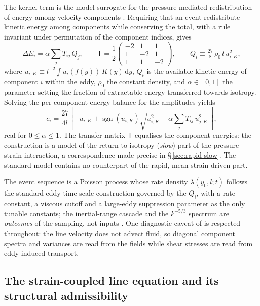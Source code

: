 \documentclass[lineno]{JFM-FLM_Au}
\begin{document}
The kernel term is the model surrogate for the pressure-mediated
redistribution of energy among velocity components
\citep{WunschKerstein2001,Kerstein2001}. Requiring that an event
redistribute kinetic energy among components while conserving the total,
with a rule invariant under permutation of the component indices, gives
\begin{equation}
  \Delta E_i = \alpha\sum_j T_{ij}\,Q_j,
  \qquad
  \mathsf{T}=\frac{1}{2}
  \begin{pmatrix}
    -2 & 1 & 1\\ 1 & -2 & 1\\ 1 & 1 & -2
  \end{pmatrix},
  \qquad
  Q_i\equiv\tfrac{27}{8}\,\rho_0\, l\, u_{i,K}^2,
  \label{eq:redistribution}
\end{equation}
where $u_{i,K}\equiv l^{-2}\!\int u_i(f(y))\,K(y)\,\mathrm{d}y$, $Q_i$ is
the available kinetic energy of component $i$ within the eddy, $\rho_0$
the constant density, and $\alpha\in[0,1]$ the parameter setting the
fraction of extractable energy transferred towards isotropy. Solving the
per-component energy balance for the amplitudes yields
\begin{equation}
  c_i = \frac{27}{4l}\left[-u_{i,K}
        +\operatorname{sgn}(u_{i,K})
        \sqrt{u_{i,K}^2+\alpha\sum_j T_{ij}\,u_{j,K}^2}\,\right],
  \label{eq:ci}
\end{equation}
real for $0\le\alpha\le1$. The transfer matrix $\mathsf{T}$ equalises the
component energies: the construction is a model of the
return-to-isotropy (\emph{slow}) part of the pressure--strain
interaction, a correspondence made precise in \S\,\ref{sec:rapid-slow}.
The standard model contains no counterpart of the rapid,
mean-strain-driven part.

The event sequence is a Poisson process whose rate density
$\lambda(y_0,l;t)$ follows the standard eddy time-scale construction
governed by the $Q_i$, with a rate constant, a viscous cutoff and a
large-eddy suppression parameter as the only tunable constants; the
inertial-range cascade and the $k^{-5/3}$ spectrum are \emph{outcomes}
of the sampling, not inputs
\citep{Kerstein1999,StephensLignell2021}. One diagnostic caveat of
\citet{Kerstein2001} is respected throughout: the line velocity does
not advect fluid, so diagonal component spectra and variances are read
from the fields while shear stresses are read from eddy-induced
transport.

\subsection{The strain-coupled line equation and its structural
admissibility}\label{sec:strain-forcing}
\end{document}
